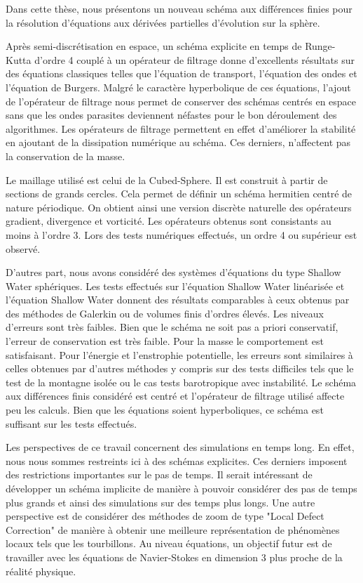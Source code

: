 
Dans cette thèse, nous présentons un nouveau schéma aux différences finies pour la résolution d'équations aux dérivées partielles d'évolution sur la sphère.

Après semi-discrétisation en espace, un schéma explicite en temps de Runge-Kutta d'ordre 4 couplé à un opérateur de filtrage donne d'excellents résultats sur des équations classiques telles que l'équation de transport, l'équation des ondes et l'équation de Burgers. Malgré le caractère hyperbolique de ces équations, l'ajout de l'opérateur de filtrage nous permet de conserver des schémas centrés en espace sans que les ondes parasites deviennent néfastes pour le bon déroulement des algorithmes. Les opérateurs de filtrage permettent en effet d'améliorer la stabilité en ajoutant de la dissipation numérique au schéma. Ces derniers, n'affectent pas la conservation de la masse.

Le maillage utilisé est celui de la Cubed-Sphere. Il est construit à partir de sections de grands cercles. Cela permet de définir un schéma hermitien centré de nature périodique. On obtient ainsi une version discrète naturelle des opérateurs gradient, divergence et vorticité. Les opérateurs obtenus sont consistants au moins à l'ordre 3. Lors des tests numériques effectués, un ordre 4 ou supérieur est observé.

D'autres part, nous avons considéré des systèmes d'équations du type Shallow Water sphériques. Les tests effectués sur l'équation Shallow Water linéarisée et l'équation Shallow Water donnent des résultats comparables à ceux obtenus par des méthodes de Galerkin ou de volumes finis d'ordres élevés. Les niveaux d'erreurs sont très faibles. Bien que le schéma ne soit pas a priori conservatif, l'erreur de conservation est très faible. Pour la masse le comportement est satisfaisant. Pour l'énergie et l'enstrophie potentielle, les erreurs sont similaires à celles obtenues par d'autres méthodes y compris sur des tests difficiles tels que le test de la montagne isolée ou le cas tests barotropique avec instabilité. Le schéma aux différences finis considéré est centré et l'opérateur de filtrage utilisé affecte peu les calculs. Bien que les équations soient hyperboliques, ce schéma est suffisant sur les tests effectués.

Les perspectives de ce travail concernent des simulations en temps long. En effet, nous nous sommes restreints ici à des schémas explicites. Ces derniers imposent des restrictions importantes sur le pas de temps. Il serait intéressant de développer un schéma implicite de manière à pouvoir considérer des pas de temps plus grands et ainsi des simulations sur des temps plus longs. Une autre perspective est de considérer des méthodes de zoom de type "Local Defect Correction" de manière à obtenir une meilleure représentation de phénomènes locaux tels que les tourbillons. Au niveau équations, un objectif futur est de travailler avec les équations de Navier-Stokes en dimension 3 plus proche de la réalité physique.

